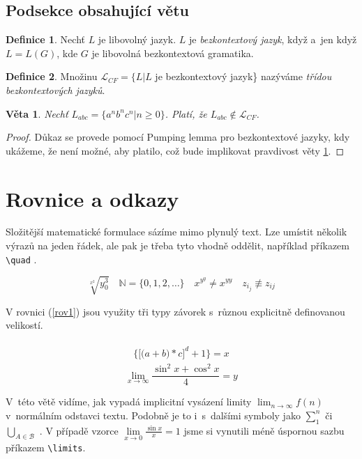 \documentclass[a4paper,twocolumn,11pt]{article}
\theoremstyle{definition}
\newtheorem{define}{Definice}[section]
\theoremstyle{plain}
\newtheorem{sente}{Věta}
\begin{document}
\subsection{Podsekce obsahující větu} 
\begin{define}
Nechť $L$ je libovolný jazyk. $L$ je \emph{bezkontextový jazyk}, když a~jen když $L = L(G)$, kde $G$ je libovolná bezkontextová gramatika.
\end{define}
\begin{define}
Množinu $\mathcal{L}_{CF} = \{L|L$ je bezkontextový jazyk\} nazýváme \emph{třídou bezkontextových jazyků}.
\end{define}
\begin{sente} \label{sentenc1}
Nechť $L_{abc} = \{a^nb^nc^n|n \geq  0\} $. Platí, že $L_{abc} \notin \mathcal{L}_{CF}$.
\end{sente}

\begin{proof}
Důkaz se provede pomocí Pumping lemma pro bezkontextové jazyky, kdy ukážeme, že není možné, aby platilo, což bude implikovat pravdivost věty \ref{sentenc1}.
\end{proof}

\section{Rovnice a odkazy}

Složitější matematické formulace sázíme mimo plynulý text. Lze umístit několik výrazů na jeden řádek, ale pak je třeba tyto vhodně oddělit, například příkazem \verb|\quad| . 

$$ \displaystyle \sqrt[x^2]{y^3_0} \quad \mathbb{N} = \{0, 1, 2,\ldots\} \quad x^{y^y} \neq x^{yy} \quad z_{i_j} \not\equiv z_{ij}$$ 

V rovnici (\ref{rov1}) jsou využity tři typy závorek s~různou explicitně definovanou velikostí.

\begin{align} \label{rov1}
	\begin{split}
		\bigg\{\Big[\big(a+b\big)*c\Big]^d+1\bigg\} = x 
	\end{split}
\end{align}
	$$	\lim_{x \to \infty} \frac{\sin^2x + \cos^2x}{4} = y $$
	
V~této větě vidíme, jak vypadá implicitní vysázení limity $ \lim_{n \to \infty} f(n) $ v~normálním odstavci textu. Podobně je to i~s~dalšími symboly jako $ \sum_1^n $ či $\bigcup_{A \in \mathcal{B}} $ . V případě vzorce $\lim\limits_{x \to 0} \frac{\sin x}{x} = 1 $ jsme si vynutili méně úspornou sazbu příkazem \verb|\limits|.
\end{document}
